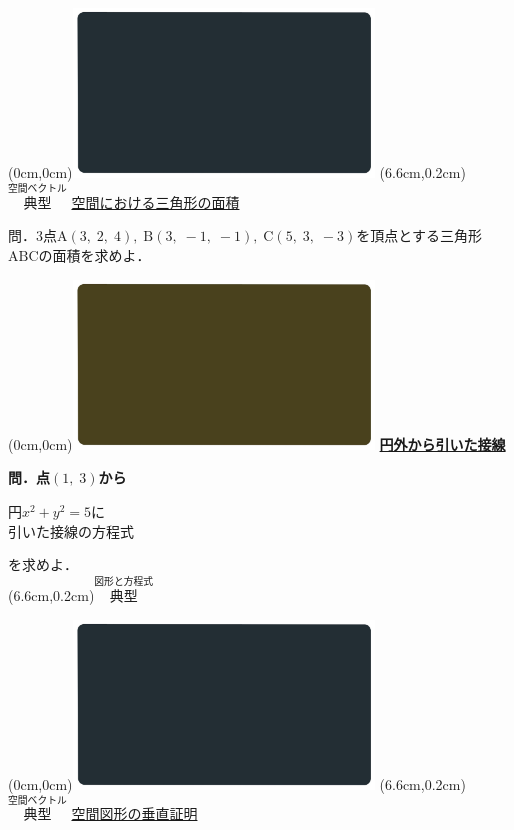 \documentclass[10pt,
fleqn,
dvipdfmx,
uplatex
]{jsarticle}
\begin{document}
\at(0cm,0cm){\includegraphics[width=8cm,bb=0 0 1920 1080]{./youtube/thumbnails/templates/smart_background/空間ベクトル.jpeg}}
\at(6.6cm,0.2cm){\small\color{bradorange}$\overset{\text{空間ベクトル}}{\text{典型}}$}
{\color{orange}\Large\underline{空間における三角形の面積}}\vspace{0.3zw}

\LARGE 
問．$3$点$\text{A}\left(3,\;2,\;4\right),\;\text{B}\left(3,\;-1,\;-1\right),\;\text{C}\left(5,\;3,\;-3\right)$を頂点とする三角形$\text{ABC}$の面積を求めよ．


\newpage

\at(0cm,0cm){\includegraphics[width=8cm,bb=0 0 1920 1080]{./youtube/thumbnails/templates/smart_background/図形と方程式.jpeg}}
{\color{orange}\bf\boldmath\LARGE\underline{円外から引いた接線}}\vspace{0.3zw}

\large
\bf\boldmath 問．点$\left(1,\;3\right)$から

\huge 
\hspace{0.1zw}
円$x^2+y^2=5$に\vspace{-0.1zw}\\
\hfill 引いた接線の方程式\vspace{0.2zw}

\large
\hfill を求めよ．\\

\at(6.6cm,0.2cm){\small\color{bradorange}$\overset{\text{図形と方程式}}{\text{典型}}$}

\newpage



\at(0cm,0cm){\includegraphics[width=8cm,bb=0 0 1920 1080]{./youtube/thumbnails/templates/smart_background/空間ベクトル.jpeg}}
\at(6.6cm,0.2cm){\small\color{bradorange}$\overset{\text{空間ベクトル}}{\text{典型}}$}
{\color{orange}\LARGE\underline{空間図形の垂直証明}}\vspace{0.3zw}
\end{document}
